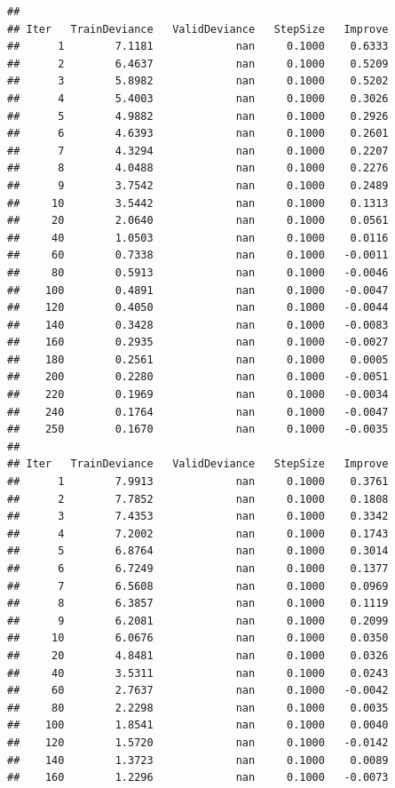 \documentclass[
]{book}
\begin{document}
\begin{verbatim}
## 
## Iter   TrainDeviance   ValidDeviance   StepSize   Improve
##      1        7.1181             nan     0.1000    0.6333
##      2        6.4637             nan     0.1000    0.5209
##      3        5.8982             nan     0.1000    0.5202
##      4        5.4003             nan     0.1000    0.3026
##      5        4.9882             nan     0.1000    0.2926
##      6        4.6393             nan     0.1000    0.2601
##      7        4.3294             nan     0.1000    0.2207
##      8        4.0488             nan     0.1000    0.2276
##      9        3.7542             nan     0.1000    0.2489
##     10        3.5442             nan     0.1000    0.1313
##     20        2.0640             nan     0.1000    0.0561
##     40        1.0503             nan     0.1000    0.0116
##     60        0.7338             nan     0.1000   -0.0011
##     80        0.5913             nan     0.1000   -0.0046
##    100        0.4891             nan     0.1000   -0.0047
##    120        0.4050             nan     0.1000   -0.0044
##    140        0.3428             nan     0.1000   -0.0083
##    160        0.2935             nan     0.1000   -0.0027
##    180        0.2561             nan     0.1000    0.0005
##    200        0.2280             nan     0.1000   -0.0051
##    220        0.1969             nan     0.1000   -0.0034
##    240        0.1764             nan     0.1000   -0.0047
##    250        0.1670             nan     0.1000   -0.0035
## 
## Iter   TrainDeviance   ValidDeviance   StepSize   Improve
##      1        7.9913             nan     0.1000    0.3761
##      2        7.7852             nan     0.1000    0.1808
##      3        7.4353             nan     0.1000    0.3342
##      4        7.2002             nan     0.1000    0.1743
##      5        6.8764             nan     0.1000    0.3014
##      6        6.7249             nan     0.1000    0.1377
##      7        6.5608             nan     0.1000    0.0969
##      8        6.3857             nan     0.1000    0.1119
##      9        6.2081             nan     0.1000    0.2099
##     10        6.0676             nan     0.1000    0.0350
##     20        4.8481             nan     0.1000    0.0326
##     40        3.5311             nan     0.1000    0.0243
##     60        2.7637             nan     0.1000   -0.0042
##     80        2.2298             nan     0.1000    0.0035
##    100        1.8541             nan     0.1000    0.0040
##    120        1.5720             nan     0.1000   -0.0142
##    140        1.3723             nan     0.1000    0.0089
##    160        1.2296             nan     0.1000   -0.0073

\end{verbatim}
\end{document}
